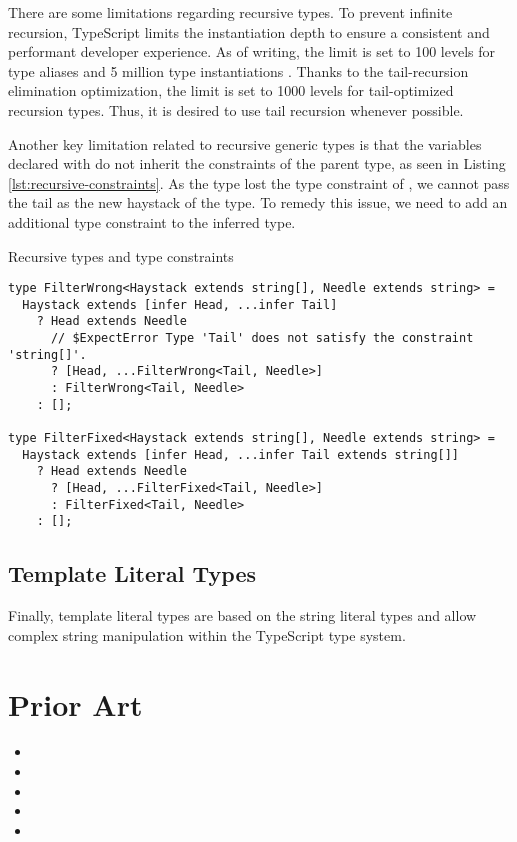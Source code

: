 There are some limitations regarding recursive types. To prevent infinite recursion, TypeScript limits the instantiation depth to ensure a consistent and performant developer experience. As of writing, the limit is set to 100 levels for type aliases and 5 million type instantiations \cite{ImplementationCheckerTs2023}. Thanks to the tail-recursion elimination optimization, the limit is set to 1000 levels for tail-optimized recursion types. Thus, it is desired to use tail recursion whenever possible.

Another key limitation related to recursive generic types is that the variables declared with  do not inherit the constraints of the parent type, as seen in Listing \ref{lst:recursive-constraints}. As the  type lost the type constraint of , we cannot pass the tail as the new haystack of the  type. To remedy this issue, we need to add an additional type constraint to the inferred type.

\begin{listing}[ht]
  \caption{Recursive types and type constraints}\label{lst:recursive-constraints}
  \begin{verbatim}
type FilterWrong<Haystack extends string[], Needle extends string> =
  Haystack extends [infer Head, ...infer Tail]
    ? Head extends Needle
      // $ExpectError Type 'Tail' does not satisfy the constraint 'string[]'.
      ? [Head, ...FilterWrong<Tail, Needle>]
      : FilterWrong<Tail, Needle>
    : [];

type FilterFixed<Haystack extends string[], Needle extends string> =
  Haystack extends [infer Head, ...infer Tail extends string[]]
    ? Head extends Needle
      ? [Head, ...FilterFixed<Tail, Needle>]
      : FilterFixed<Tail, Needle>
    : [];
\end{verbatim}
\end{listing}

\subsection{Template Literal Types}

Finally, template literal types are based on the string literal types and allow complex string manipulation within the TypeScript type system.

\section{Prior Art}

\begin{itemize}
  \item {}
  \item {}
  \item {}
  \item {}
  \item {}
\end{itemize}